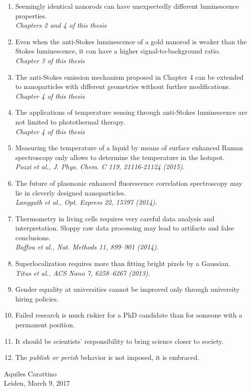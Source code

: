 \documentclass{dissertation}
\begin{document}
\begin{enumerate}

\item Seemingly identical nanorods can have unexpectedly different luminescence
properties.
\\
\textit{Chapters 2 and 4 of this thesis} 

\item Even when the anti-Stokes luminescence of a gold nanorod is weaker than
the Stokes luminescence, it can have a higher signal-to-background ratio.
\\
\textit{Chapter 3 of this thesis} 

\item The anti-Stokes emission mechanism proposed in Chapter 4 can be extended
to nanoparticles with different geometries without further modifications.
\\
\textit{Chapter 4 of this thesis}

\item The applications of temperature sensing through anti-Stokes luminescence
are not limited to photothermal therapy.
\\
\textit{Chapter 4 of this thesis}

\item Measuring the temperature of a liquid by means of surface enhanced Raman
spectroscopy only allows to determine the temperature in the hotspot. \\
\textit{Pozzi et al., J. Phys. Chem. C 119, 21116-21124 (2015).}

\item The future of plasmonic enhanced fluorescence correlation spectroscopy may
lie in cleverly designed nanoparticles. \\
\textit{Langguth et al., Opt. Express 22, 15397 (2014).}

\item Thermometry in living cells requires very careful data analysis and
interpretation. Sloppy raw data processing may lead to artifacts and false
conclusions.
\\
\textit{Baffou et al., Nat. Methods 11, 899–901 (2014).}

\item Superlocalization requires more than fitting bright pixels by a
Gaussian.\\
\textit{Titus et al., ACS Nano 7, 6258–6267 (2013).}

\item Gender equality at universities cannot be improved only through 
university hiring policies. 

\item Failed research is much riskier for a PhD candidate than for someone with
a permanent position.

\item It should be scientists' responsibility to bring science closer to
society.

\item The \textit{publish or perish} behavior is not imposed, it is embraced.

\end{enumerate}

\bigskip

\begin{center}
Aquiles Carattino \\
Leiden, March 9, 2017
\end{center}
\end{document}
